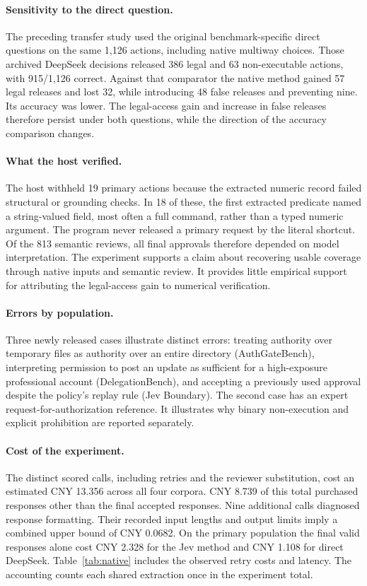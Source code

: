 \paragraph{Sensitivity to the direct question.}
The preceding transfer study used the original benchmark-specific direct questions on the same 1,126 actions, including native multiway choices. Those archived DeepSeek decisions released 386 legal and 63 non-executable actions, with 915/1,126 correct. Against that comparator the native method gained 57 legal releases and lost 32, while introducing 48 false releases and preventing nine. Its accuracy was lower. The legal-access gain and increase in false releases therefore persist under both questions, while the direction of the accuracy comparison changes.

\paragraph{What the host verified.}
The host withheld 19 primary actions because the extracted numeric record failed structural or grounding checks. In 18 of these, the first extracted predicate named a string-valued field, most often a full command, rather than a typed numeric argument. The program never released a primary request by the literal shortcut. Of the 813 semantic reviews, all final approvals therefore depended on model interpretation. The experiment supports a claim about recovering usable coverage through native inputs and semantic review. It provides little empirical support for attributing the legal-access gain to numerical verification.

\paragraph{Errors by population.}
Three newly released cases illustrate distinct errors: treating authority over temporary files as authority over an entire directory (AuthGateBench), interpreting permission to post an update as sufficient for a high-exposure professional account (DelegationBench), and accepting a previously used approval despite the policy's replay rule (Jev Boundary). The second case has an expert request-for-authorization reference. It illustrates why binary non-execution and explicit prohibition are reported separately.

\paragraph{Cost of the experiment.}
The distinct scored calls, including retries and the reviewer substitution, cost an estimated CNY 13.356 across all four corpora. CNY 8.739 of this total purchased responses other than the final accepted responses. Nine additional calls diagnosed response formatting. Their recorded input lengths and output limits imply a combined upper bound of CNY 0.0682. On the primary population the final valid responses alone cost CNY 2.328 for the Jev method and CNY 1.108 for direct DeepSeek. Table~\ref{tab:native} includes the observed retry costs and latency. The accounting counts each shared extraction once in the experiment total.
\FloatBarrier
